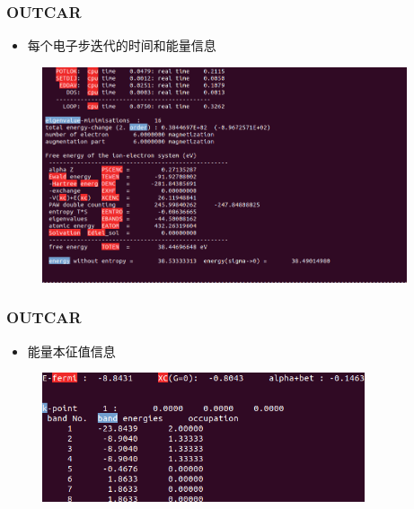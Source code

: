 \frame
{
	\frametitle{\textrm{OUTCAR}}
	\begin{itemize}
		\item 每个电子步迭代的时间和能量信息
	\end{itemize}
\begin{figure}[h!]
\centering
\includegraphics[height=2.5in,viewport=0 40 770 555,clip]{Figures/VASP_train-OUTCAR-iteration.png}
\caption{\fontsize{6.2pt}{5.2pt}}%
\label{VASP_train-OUTCAR-iteration}
\end{figure} 
}

\frame
{
	\frametitle{\textrm{OUTCAR}}
	\begin{itemize}
	\item 能量本征值信息
	\end{itemize}
\begin{figure}[h!]
\centering
\includegraphics[height=1.5in,viewport=0 0 580 235,clip]{Figures/VASP_train-OUTCAR-eigenvalue.png}
\caption{\fontsize{6.2pt}{5.2pt}}%
\label{VASP_train-OUTCAR-eigenvalue}
\end{figure}
}

